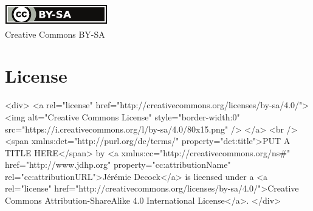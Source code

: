 \ifpdf

    \vfill %
    \begin{center}
        \href{http://creativecommons.org/licenses/by-sa/4.0/}{\includegraphics[width=.15\linewidth]{figs/cc_by_sa_small}}\\
        \small{Creative Commons BY-SA}
    \end{center}

\else

    \section*{License}\label{sec:license}

    \begin{rawhtml}

        <div>
            <a rel="license" href="http://creativecommons.org/licenses/by-sa/4.0/">
                <img alt="Creative Commons License" style="border-width:0" src="https://i.creativecommons.org/l/by-sa/4.0/80x15.png" />
            </a>
            <br />
            <span xmlns:dct="http://purl.org/dc/terms/" property="dct:title">PUT A TITLE HERE</span>
            by <a xmlns:cc="http://creativecommons.org/ns#" href="http://www.jdhp.org" property="cc:attributionName" rel="cc:attributionURL">Jérémie Decock</a>
            is licensed under a
            <a rel="license" href="http://creativecommons.org/licenses/by-sa/4.0/">Creative Commons Attribution-ShareAlike 4.0 International License</a>.
        </div>

    \end{rawhtml}
 



\fi
